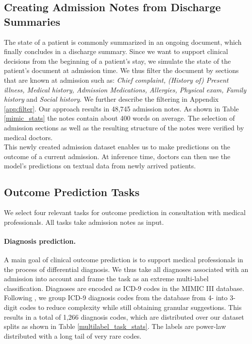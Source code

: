 \documentclass[11pt,a4paper]{article}
\begin{document}
\subsection{Creating Admission Notes from Discharge Summaries} \label{section:admission_time}
The state of a patient is commonly summarized in an ongoing document, which finally concludes in a discharge summary. Since we want to support clinical decisions from the beginning of a patient's stay, we simulate the state of the patient's document at admission time. We thus filter the document by sections that are known at admission such as: \textit{Chief complaint, (History of) Present illness, Medical history, Admission Medications, Allergies, Physical exam, Family history} and \textit{Social history}. We further describe the filtering in Appendix \ref{app:filter}. Our approach results in 48,745 admission notes. As shown in Table \ref{mimic_stats} the notes contain about 400 words on average.
The selection of admission sections as well as the resulting structure of the notes were verified by medical doctors.\\
This newly created admission dataset enables us to make predictions on the outcome of a current admission. At inference time, doctors can then use the model's predictions on textual data from newly arrived patients.

\subsection{Outcome Prediction Tasks} \label{section:outcome_tasks}
We select four relevant tasks for outcome prediction in consultation with medical professionals. All tasks take admission notes as input.

\paragraph{Diagnosis prediction.} A main goal of clinical outcome prediction is to support medical professionals in the process of differential diagnosis. We thus take all diagnoses associated with an admission into account and frame the task as an extreme multi-label classification. Diagnoses are encoded as ICD-9 codes in the MIMIC III database. Following \citet{medgan}, we group ICD-9 diagnosis codes from the database from 4- into 3-digit codes to reduce complexity while still obtaining granular suggestions. This results in a total of 1,266 diagnosis codes, which are distributed over our dataset splits as shown in Table \ref{multilabel_task_stats}. The labels are power-law distributed with a long tail of very rare codes.
\end{document}
